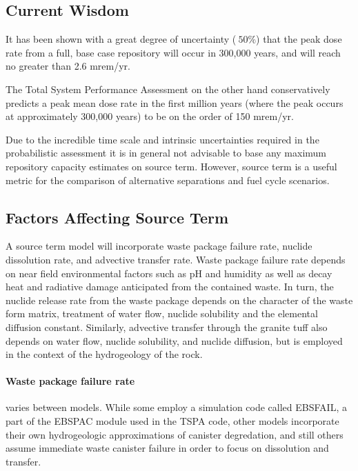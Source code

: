 \subsection{Current Wisdom}
It has been shown with a great degree of uncertainty ($~50\%$) that 
the peak dose rate from a full, base case repository will occur in 
300,000 years, and will reach no greater than 2.6 
mrem/yr.\cite{li_methodology_2006}

The Total System Performance Assessment on the other hand 
conservatively predicts a peak mean dose rate in the first million 
years (where the peak occurs at approximately 300,000 years) to be on 
the order of 150 mrem/yr.\cite{williams_contract_2001} 

Due to the incredible time scale and intrinsic uncertainties required 
in the probabilistic assessment it is in general not advisable to base 
any maximum repository capacity estimates on source term. However, 
source term is a useful metric for the comparison of alternative 
separations and fuel cycle scenarios.

\subsection{Factors Affecting Source Term}
A source term model will incorporate waste package failure rate, 
nuclide dissolution rate, and advective transfer rate. Waste package 
failure rate depends on near field environmental factors such as pH 
and humidity as well as decay heat and radiative damage anticipated 
from the contained waste.  In turn, the nuclide release rate from the 
waste package depends on the character of the waste form matrix, 
treatment of water flow, nuclide solubility and the elemental 
diffusion constant. Similarly, advective transfer through the granite 
tuff also depends on water flow, nuclide solubility, and nuclide 
diffusion, but is employed in the context of the hydrogeology of the 
rock.   

\paragraph{Waste package failure rate} varies between models. While 
some employ a simulation code called EBSFAIL, a part of the EBSPAC 
module used in the TSPA code, other models incorporate their own 
hydrogeologic approximations of canister degredation, and still others 
assume immediate waste canister failure in order to focus on 
dissolution and transfer.  \newline


